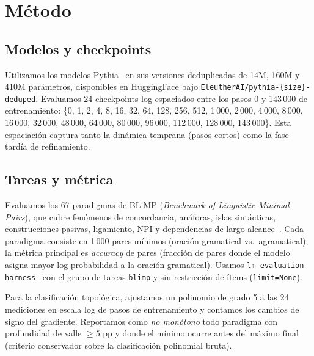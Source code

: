 \documentclass[11pt]{article}
\begin{document}
\section{Método}
\label{sec:metodo}

\subsection{Modelos y checkpoints}
Utilizamos los modelos Pythia~\cite{biderman2023pythia} en sus versiones deduplicadas de 14M, 160M y 410M parámetros, disponibles en HuggingFace bajo \texttt{EleutherAI/pythia-\{size\}-deduped}. Evaluamos 24 checkpoints log-espaciados entre los pasos 0 y 143\,000 de entrenamiento: \{0, 1, 2, 4, 8, 16, 32, 64, 128, 256, 512, 1\,000, 2\,000, 4\,000, 8\,000, 16\,000, 32\,000, 48\,000, 64\,000, 80\,000, 96\,000, 112\,000, 128\,000, 143\,000\}. Esta espaciación captura tanto la dinámica temprana (pasos cortos) como la fase tardía de refinamiento.

\subsection{Tareas y métrica}
Evaluamos los 67 paradigmas de BLiMP (\textit{Benchmark of Linguistic Minimal Pairs}), que cubre fenómenos de concordancia, anáforas, islas sintácticas, construcciones pasivas, ligamiento, NPI y dependencias de largo alcance~\cite{warstadt2020blimp}. Cada paradigma consiste en 1\,000 pares mínimos (oración gramatical vs.\ agramatical); la métrica principal es \textit{accuracy} de pares (fracción de pares donde el modelo asigna mayor log-probabilidad a la oración gramatical). Usamos \texttt{lm-evaluation-harness}~\cite{eval-harness} con el grupo de tareas \texttt{blimp} y sin restricción de ítems (\texttt{limit=None}).

Para la clasificación topológica, ajustamos un polinomio de grado 5 a las 24 mediciones en escala log de pasos de entrenamiento y contamos los cambios de signo del gradiente. Reportamos como \textit{no monótono} todo paradigma con profundidad de valle $\geq 5$ pp y donde el mínimo ocurre antes del máximo final (criterio conservador sobre la clasificación polinomial bruta).
\end{document}
